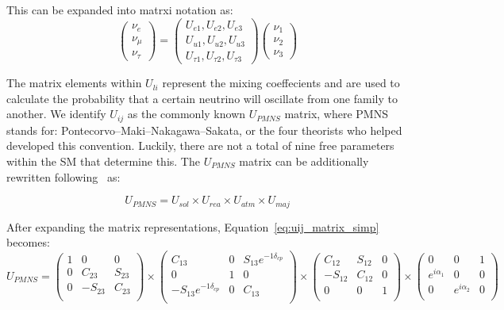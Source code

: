 This can be expanded into matrxi notation as:
\begin{equation}~\label{eq:mass_eigenstates}
\begin{pmatrix}
\nu_e\\
\nu_{\mu}\\
\nu_{\tau}
\end{pmatrix}
=
\begin{pmatrix}
U_{e1}, U_{e2}, U_{e3} \\
U_{u1}, U_{u2}, U_{u3} \\
U_{\tau1}, U_{\tau2}, U_{\tau3}
\end{pmatrix}
\begin{pmatrix}
\nu_1\\
\nu_2\\
\nu_3
\end{pmatrix}
\end{equation}

The matrix elements within $U_{li}$ represent the mixing coeffecients and are used to calculate the probability that a certain neutrino will oscillate from one family to another.
We identify $U_{ij}$ as the commonly known $U_{PMNS}$ matrix, where PMNS stands for: Pontecorvo–Maki–Nakagawa–Sakata, or the four theorists who helped developed this convention.
Luckily, there are not a total of nine free parameters within the SM that determine this.
The $U_{PMNS}$ matrix can be additionally rewritten following~\citep{Pontecorvo:1957qd, 1962PThPh..28..870M} as:

\begin{equation}~\label{eq:uij_matrix_simp}
U_{PMNS}
=
U_{sol} \times U_{rea} \times U_{atm} \times U_{maj}
\end{equation}

After expanding the matrix representations, Equation~\ref{eq:uij_matrix_simp} becomes:
\begin{equation}
U_{PMNS}
=
\begin{pmatrix}
1 & 0 & 0 \\
0 & C_{23} & S_{23} \\
0 & -S_{23} & C_{23} \\
\end{pmatrix}
\times
\begin{pmatrix}
C_{13} & 0 & S_{13}e^{-1\delta_{cp}} \\
0 & 1 & 0 \\
-S_{13}e^{-1\delta_{cp}} & 0 & C_{13} \\
\end{pmatrix}
\times
\begin{pmatrix}
C_{12} & S_{12} & 0 \\
-S_{12} & C_{12} & 0 \\
0 & 0 & 1 \\
\end{pmatrix}
\times
\begin{pmatrix}
0 & 0 & 1 \\
e^{i\alpha_{1}} & 0 & 0 \\
0 & e^{i\alpha_{2}} & 0 \\
\end{pmatrix}
\end{equation}

